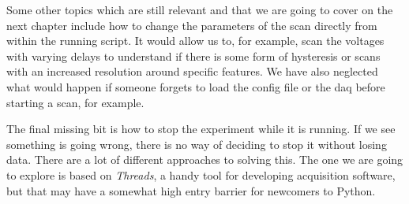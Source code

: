 Some other topics which are still relevant and that we are going to cover on the next chapter include how to change the parameters of the scan directly from within the running script. It would allow us to, for example, scan the voltages with varying delays to understand if there is some form of hysteresis or scans with an increased resolution around specific features. We have also neglected what would happen if someone forgets to load the config file or the daq before starting a scan, for example.

The final missing bit is how to stop the experiment while it is running. If we see something is going wrong, there is no way of deciding to stop it without losing data. There are a lot of different approaches to solving this. The one we are going to explore is based on \emph{Threads}, a handy tool for developing acquisition software, but that may have a somewhat high entry barrier for newcomers to Python.
